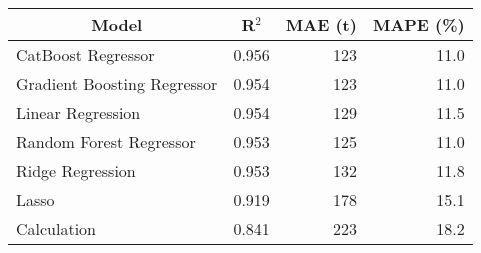 
\begin{tabular}[t]{lrrr}
\toprule
\multicolumn{1}{c}{Model} & \multicolumn{1}{c}{R$^2$} & \multicolumn{1}{c}{MAE (t)} & \multicolumn{1}{c}{MAPE (\%)}\\
\midrule
CatBoost Regressor & 0.956 & 123 & 11.0\\
Gradient Boosting Regressor & 0.954 & 123 & 11.0\\
Linear Regression & 0.954 & 129 & 11.5\\
Random Forest Regressor & 0.953 & 125 & 11.0\\
Ridge Regression & 0.953 & 132 & 11.8\\
Lasso & 0.919 & 178 & 15.1\\
Calculation & 0.841 & 223 & 18.2\\
\bottomrule
\end{tabular}
